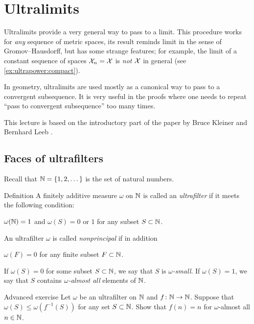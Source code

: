 \chapter{Ultralimits}\label{chap:ultralimits}

Ultralimits provide a very general way to pass to a limit.
This procedure works for \textit{any} sequence of metric spaces, its result reminds limit in the sense of Gromov--Hausdorff, but has some strange features; for example, the limit of a constant sequence of spaces $\mathcal{X}_n=\mathcal{X}$ is \textit{not} $\mathcal{X}$ in general (see \ref{ex:ultrapower:compact}).

In geometry, ultralimits are used mostly as a canonical way to pass to a convergent subsequence.
It is very useful in the proofs where one needs to repeat ``pass to convergent subsequence'' too many times.

This lecture is based on the introductory part of the paper by Bruce Kleiner and Bernhard Leeb \cite{kleiner-leeb}.

\section{Faces of ultrafilters}

Recall that $\mathbb{N}=\{1,2,\dots\}$ is the set of natural numbers.

\begin{thm}{Definition}
A finitely additive measure $\omega$ 
on $\mathbb{N}$ 
is called an \emph{ultrafilter} if it meets the following condition:
\begin{subthm}{}
$\omega(\mathbb{N})=1$ and 
$\omega(S)=0$ or $1$ for any subset $S\subset \mathbb{N}$.
\end{subthm}
An ultrafilter $\omega$ is called 
\emph{nonprincipal} if in addition 
\begin{subthm}{}
$\omega(F)=0$ for any finite subset $F\subset \mathbb{N}$.
\end{subthm}
\end{thm}

If $\omega(S)=0$ for some subset $S\subset \mathbb{N}$,
we say that $S$ is \emph{$\omega$-small}. 
If $\omega(S)=1$, we say that $S$ contains \emph{$\omega$-almost all} elements of $\mathbb{N}$.

\begin{thm}{Advanced exercise}\label{ex:ultrakatetov}
Let $\omega$ be an ultrafilter on $\mathbb{N}$ and $f\:\NN\z\to \NN$.
Suppose that $\omega(S)\le \omega(f^{-1}(S))$ for any set $S\subset \mathbb{N}$.
Show that $f(n)=n$ for $\omega$-almost all $n\in\mathbb{N}$.
\end{thm}


